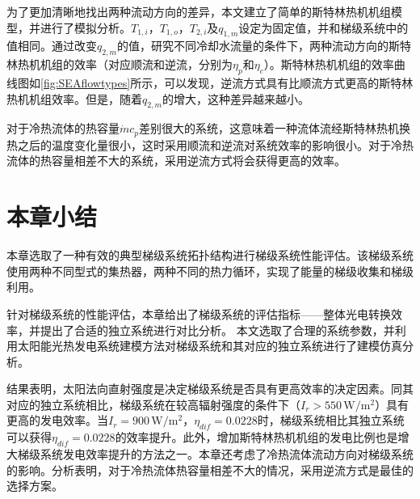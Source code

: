 为了更加清晰地找出两种流动方向的差异，本文建立了简单的斯特林热机机组模型，并进行了模拟分析。$T_{1,i}，T_{1,o}，T_{2,i}及q_{1,m}$设定为固定值，并和梯级系统中的值相同。通过改变$q_{2,m}$的值，研究不同冷却水流量的条件下，两种流动方向的斯特林热机机组的效率（对应顺流和逆流，分别为$\eta_p$和$\eta_c$）。斯特林热机机组的效率曲线图如\autoref{fig:SEAflowtypes}所示，可以发现，逆流方式具有比顺流方式更高的斯特林热机机组效率。但是，随着$q_{2,m}$的增大，这种差异越来越小。

对于冷热流体的热容量$\dot{m}c_p$差别很大的系统，这意味着一种流体流经斯特林热机换热之后的温度变化量很小，这时采用顺流和逆流对系统效率的影响很小。对于冷热流体的热容量相差不大的系统，采用逆流方式将会获得更高的效率。

\section{本章小结}

本章选取了一种有效的典型梯级系统拓扑结构进行梯级系统性能评估。该梯级系统使用两种不同型式的集热器，两种不同的热力循环，实现了能量的梯级收集和梯级利用。

针对梯级系统的性能评估，本章给出了梯级系统的评估指标——整体光电转换效率，并提出了合适的独立系统进行对比分析。
本文选取了合理的系统参数，并利用太阳能光热发电系统建模方法对梯级系统和其对应的独立系统进行了建模仿真分析。

结果表明，太阳法向直射强度是决定梯级系统是否具有更高效率的决定因素。同其对应的独立系统相比，梯级系统在较高辐射强度的条件下（$I_r > 550\,\mathrm{W/m^2}$）具有更高的发电效率。当$I_r=900\,\mathrm{W/m^2}$，$\eta_{dif}=0.0228$时，梯级系统相比其独立系统可以获得$\eta_{dif}=0.0228$的效率提升。此外，增加斯特林热机机组的发电比例也是增大梯级系统发电效率提升的方法之一。本章还考虑了冷热流体流动方向对梯级系统的影响。分析表明，对于冷热流体热容量相差不大的情况，采用逆流方式是最佳的选择方案。

